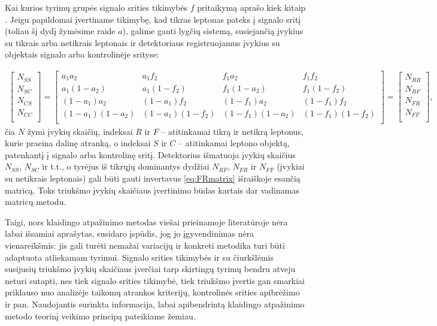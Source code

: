 \documentclass[a4paper, 12pt, oneside]{article}
\newlength\q
\begin{document}
Kai kurios tyrimų grupės signalo srities tikimybės $f$ pritaikymą aprašo kiek kitaip \cite{DY_ATLAS2016, Z'_ATLAS2014}.
Jeigu papildomai įvertiname tikimybę, kad tikras leptonas pateks į signalo sritį (toliau šį dydį žymėsime raide $a$), galime
gauti lygčių sistemą, susiejančią įvykius su tikrais arba netikrais leptonais ir detektoriaus registruojamus įvykius su
objektais signalo arba kontrolinėje srityse:

\begin{align}
\label{eq:FRmatrix}
	\begin{bmatrix}
		N_{SS} \\		
		N_{SC} \\
		N_{CS} \\
		N_{CC} \\
	\end{bmatrix}
	=
	\begin{bmatrix}
		a_1a_2 & a_1f_2 & f_1a_2 & f_1f_2 \\
		a_1(1-a_2) & a_1(1-f_2) & f_1(1-a_2) & f_1(1-f_2) \\
		(1-a_1)a_2 & (1-a_1)f_2 & (1-f_1)a_2 & (1-f_1)f_2 \\
		(1-a_1)(1-a_2) & (1-a_1)(1-f_2) & (1-f_1)(1-a_2) & (1-f_1)(1-f_2) \\
	\end{bmatrix}
	=
	\begin{bmatrix}
		N_{RR} \\
		N_{RF} \\
		N_{FR} \\
		N_{FF} \\
	\end{bmatrix}
	\! ,
\end{align}
čia $N$ žymi įvykių skaičių, indeksai $R$ ir $F$ -- atitinkamai tikrą ir netikrą leptonus, kurie praeina dalinę atranką,
o indeksai $S$ ir $C$ -- atitinkamai leptono objektą, patenkantį į signalo arba kontrolinę sritį.
Detektorius išmatuoja įvykių skaičius $N_{SS}$, $N_{SC}$ ir t.t., o tyrėjus iš tikrųjų dominantys dydžiai $N_{RF}$, $N_{FR}$ ir
$N_{FF}$ (įvykiai su netikrais leptonais) gali būti gauti invertavus \eqref{eq:FRmatrix} išraiškoje esančią matricą.
Toks triukšmo įvykių skaičiaus įvertinimo būdas kartais dar vadinamas matricų metodu.

Taigi, nors klaidingo atpažinimo metodas viešai prieinamoje literatūroje nėra labai išsamiai aprašytas, susidaro įspūdis, jog
jo įgyvendinimas nėra vienareikšmis: jis gali turėti nemažai variacijų ir konkreti metodika turi būti adaptuota atliekamam tyrimui.
Signalo srities tikimybės ir su čiurkšlėmis susijusių triukšmo įvykių skaičiaus įverčiai tarp skirtingų tyrimų bendru atveju neturi
sutapti, nes tiek signalo srities tikimybė, tiek triukšmo įvertis gan smarkiai priklauso nuo analizėje taikomų atrankos kriterijų,
kontrolinės srities apibrėžimo ir pan.
Naudojantis surinkta informacija, labai apibendrintą klaidingo atpažinimo metodo teorinį veikimo principą pateikiame žemiau.
\end{document}
